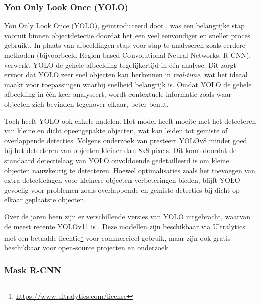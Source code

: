 \subsubsection{You Only Look Once (YOLO)}
\label{sec:yolo}

You Only Look Once (YOLO), geïntroduceerd door \textcite{Redmon2016}, was een belangrijke stap vooruit binnen objectdetectie doordat het een veel eenvoudiger en sneller proces gebruikt. 
In plaats van afbeeldingen stap voor stap te analyseren zoals eerdere methoden (bijvoorbeeld Region-based Convolutional Neural Networks, R-CNN), verwerkt YOLO de gehele afbeelding tegelijkertijd in één analyse. 
Dit zorgt ervoor dat YOLO zeer snel objecten kan herkennen in \textit{real-time}, wat het ideaal maakt voor toepassingen waarbij snelheid belangrijk is.
Omdat YOLO de gehele afbeelding in één keer analyseert, wordt contextuele informatie zoals waar objecten zich bevinden tegenover elkaar, beter benut.

Toch heeft YOLO ook enkele nadelen. Het model heeft moeite met het detecteren van kleine en dicht opeengepakte objecten, wat kan leiden tot gemiste of overlappende detecties. 
Volgens onderzoek van \textcite{Huang2024} presteert YOLOv8 minder goed bij het detecteren van objecten kleiner dan 8x8 pixels. 
Dit komt doordat de standaard detectielaag van YOLO onvoldoende gedetailleerd is om kleine objecten nauwkeurig te detecteren. 
Hoewel optimalisaties zoals het toevoegen van extra detectielagen voor kleinere objecten verbeteringen bieden, blijft YOLO gevoelig voor problemen zoals overlappende en gemiste detecties bij dicht op elkaar geplaatste objecten.

Over de jaren heen zijn er verschillende versies van YOLO uitgebracht, waarvan de meest recente YOLOv11 is \autocite{Khanam2024}.
Deze modellen zijn beschikbaar via Ultralytics met een betaalde licentie\footnote{\url{https://www.ultralytics.com/license}} voor commercieel gebruik, maar zijn ook gratis beschikbaar voor open-source projecten en onderzoek.

\subsubsection{Mask R-CNN}


